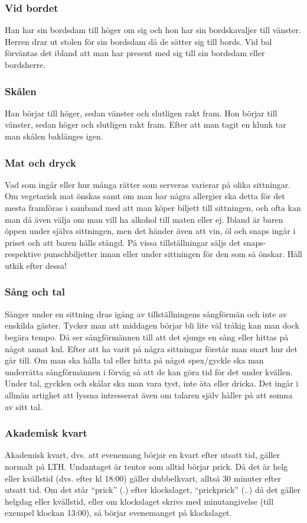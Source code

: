 \documentclass{article}
\begin{document}
\subsubsection{Vid bordet}
Han har sin bordsdam till höger om sig och hon har sin
bordskavaljer till vänster. Herren drar ut stolen för sin
bordsdam då de sätter sig till bords. Vid bal förväntas det
ibland att man har present med sig till sin bordsdam eller
bordsherre.

\subsubsection{Skålen}
Han börjar till höger, sedan vänster och slutligen rakt
fram. Hon börjar till vänster, sedan höger och slutligen
rakt fram. Efter att man tagit en klunk tar man skålen
baklänges igen.

\subsubsection{Mat och dryck}
Vad som ingår eller hur många rätter som serveras
varierar på olika sittningar. Om vegetarisk mat önskas
samt om man har några allergier ska detta för det mesta
framföras i samband med att man köper biljett till
sittningen, och ofta kan man då även välja om man vill ha
alkohol till maten eller ej.
Ibland är baren öppen under själva sittningen, men det
händer även att vin, öl och snaps ingår i priset och att
baren hålls stängd. På vissa tillställningar säljs det snaps-
respektive punschbiljetter innan eller under sittningen för
den som så önskar. Håll utkik efter dessa!

\subsubsection{Sång och tal}
Sånger under en sittning dras igång av tillställningens
sångförmän och inte av enskilda gäster. Tycker man att
middagen börjar bli lite väl tråkig kan man dock begära
tempo. Då ser sångförmännen till att det sjungs en sång
eller hittas på något annat kul. Efter att ha varit på några
sittningar förstår man snart hur det går till. Om man ska
hålla tal eller hitta på något spex/gyckle ska man
underrätta sångförmännen i förväg så att de kan göra tid
för det under kvällen. Under tal, gycklen och skålar ska
man vara tyst, inte äta eller dricka. Det ingår i allmän
artighet att lyssna intresserat även om talaren själv håller
på att somna av sitt tal.


\subsubsection{Akademisk kvart}
Akademisk kvart, dvs. att evenemang börjar en kvart efter
utsatt tid, gäller normalt på LTH. Undantaget är tentor
som alltid börjar prick. Då det är helg eller kvällstid (dvs.
efter kl 18:00) gäller dubbelkvart, alltså 30 minuter efter
utsatt tid. Om det står ``prick'' (.) efter klockslaget,
``prickprick'' (..) då det gäller helgdag eller kvällstid, eller
om klockslaget skrivs med minutangivelse (till exempel klockan 13:00), så börjar
evenemanget på klockslaget.
\end{document}
